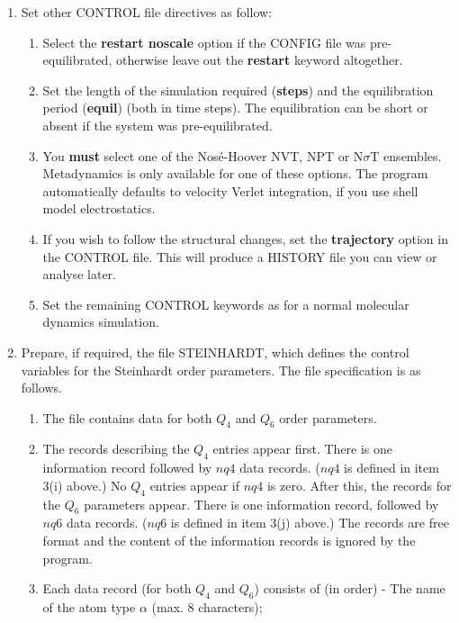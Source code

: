 \begin{enumerate}
\begin{enumerate}
\end{enumerate}
\item Set other CONTROL file directives as follow:
\begin{enumerate}
\item Select the {\bf restart noscale} option if the CONFIG file was
      pre-equilibrated, otherwise leave out the {\bf restart} keyword 
      altogether.
\item Set the length of the simulation required ({\bf steps}) and the 
      equilibration period ({\bf equil}) (both in time steps). The
      equilibration can be short or absent if the system was pre-equilibrated.
\item You {\bf must} select one of the Nos\'{e}-Hoover NVT, NPT or
      N$\sigma$T ensembles.  Metadynamics is only available for one of these
      options. The program automatically defaults to velocity Verlet 
      integration, if you use shell model electrostatics.
\item If you wish to follow the structural changes, set the {\bf
      trajectory} option in the CONTROL file. This will produce a HISTORY file
      you can view or analyse later.
\item Set the remaining CONTROL keywords as for a normal molecular dynamics
  simulation. 
\end{enumerate}
\item Prepare, if required, the file STEINHARDT, which defines the 
  control variables for the Steinhardt order parameters. The file 
  specification is as follows.  
\begin{enumerate}
\item The file contains data for both  $Q_{4}$ and $Q_{6}$ order 
  parameters. 
\item The records describing the $Q_{4}$ entries appear first. There is 
  one information record followed by $nq4$ data records. ($nq4$ is defined in
  item 3(i) above.) No $Q_{4}$ entries appear if $nq4$ is zero. After this, 
  the records for the  $Q_{6}$ parameters appear.  There is one information 
  record, followed by $nq6$ data records. ($nq6$ is defined in item
  3(j) above.) The records are free format and the content of
  the information records is ignored by the program.
\item Each data record (for both $Q_{4}$ and $Q_{6}$) consists of 
  (in order)\newline
  - The name of the atom type $\alpha$ (max. 8 characters); \newline

\end{enumerate}
\end{enumerate}
